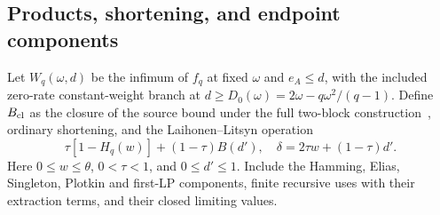 \documentclass[12pt,letterpaper,onecolumn]{article}
\theoremstyle{definition}
\theoremstyle{remark}
\begin{document}
\subsection{Products, shortening, and endpoint components}
Let \(W_q(\omega,d)\) be the infimum of \(f_q\) at fixed \(\omega\) and \(e_A\le d\), with the included zero-rate constant-weight branch at
\(d\ge D_0(\omega)=2\omega-q\omega^2/(q-1)\).
Define \(B_{\rm cl}\) as the closure of the source bound under the full two-block construction~\cite[Thms.~6--7]{BHL2007}, ordinary shortening, and the Laihonen--Litsyn operation~\cite[Thm.~1]{LL1998}
\begin{equation}\label{eq:LL}
\tau[1-H_q(w)]+(1-\tau)B(d'),\quad
\delta=2\tau w+(1-\tau)d'.
\end{equation}
Here \(0\le w\le\theta\), \(0<\tau<1\), and \(0\le d'\le1\). Include the Hamming, Elias, Singleton, Plotkin and first-LP components, finite recursive uses with their extraction terms, and their closed limiting values.
\end{document}
